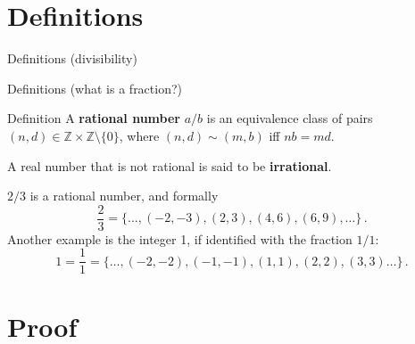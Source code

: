 \documentclass[t]{beamer} %
\begin{document}
\section{Definitions}

\begin{frame}{Definitions (divisibility)}
    
    
    
\end{frame}


\begin{frame}{Definitions (what is a fraction?)}
    
    \begin{block}{Definition}
        A \textbf{rational number} $a/b$ is an equivalence class of pairs $(n,d)\in\mathbb{Z}\times\mathbb{Z}\setminus\{0\}$, where $(n,d)\sim(m,b)$ iff $nb=md$. 
        
        A real number that is not rational is said to be \textbf{irrational}.
    \end{block}

    \begin{examples}
    $2/3$ is a rational number, and formally \[\frac{2}{3}=\{\ldots,(-2,-3),(2,3),(4,6),(6,9),\ldots\}\,.\]
    Another example is the integer 1, if identified with the fraction $1/1$:
    \[1=\frac{1}{1}=\{\ldots,(-2,-2),(-1,-1),(1,1),(2,2),(3,3)\ldots\}\,.\]
    \end{examples}

\end{frame}

\section{Proof}
\end{document}
